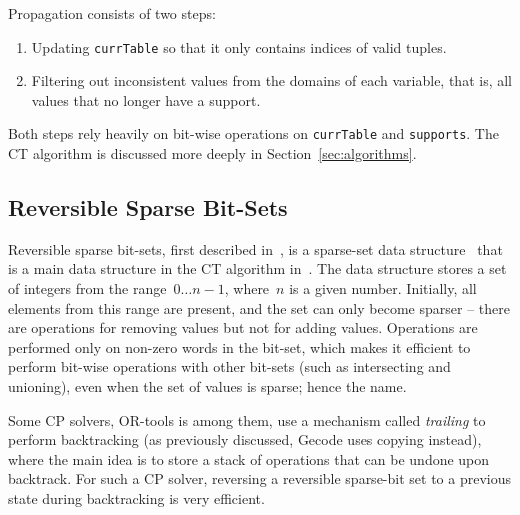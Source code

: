 \documentclass[a4paper,11pt]{article}
\newcommand{\T}[1]{\texttt{#1}}
\newcommand{\Secref}[1]{Section~\ref{#1}}
\newcommand{\CTpaper}[0]{DBLP:conf/cp/DemeulenaereHLP16}
\numberwithin{equation}{section}
\begin{document}
Propagation consists of two steps:

\begin{enumerate}
  \item Updating \texttt{currTable} so that it only contains indices
    of valid tuples.
  \item Filtering out inconsistent values from the domains of each
    variable, that is,
    all values that no longer have a support.
\end{enumerate}

\noindent
Both steps rely heavily on bit-wise operations on \T{currTable} and
\T{supports}. The CT algorithm is discussed more deeply in \Secref{sec:algorithms}.

\subsection{Reversible Sparse Bit-Sets}
\label{bg:sbs}
Reversible sparse bit-sets, first described in~\cite{\CTpaper},
is a sparse-set data structure~\cite{Briggs93anefficient,Schaus13sparse-setsfor}
that is a main data structure in the CT algorithm in~\cite{\CTpaper}.
The data structure stores a set of
integers from the range~$0 \ldots n-1$, where~$n$ is a given number.
Initially, all elements from this range are present, and 
the set can only become sparser -- there are operations for
removing values but not for adding values.
Operations are performed only on non-zero words in the bit-set,
which makes it efficient to perform bit-wise operations
with other bit-sets (such as intersecting and unioning),
even when the set of values is sparse; hence the name.


Some CP solvers, OR-tools is among them,
use a mechanism called \emph{trailing}
to perform backtracking
(as previously discussed, Gecode uses copying instead),
where the main idea is to store a stack of operations that can
be undone upon backtrack.
For such a CP solver, reversing a reversible sparse-bit set
to a previous state during backtracking is very efficient.
\end{document}
